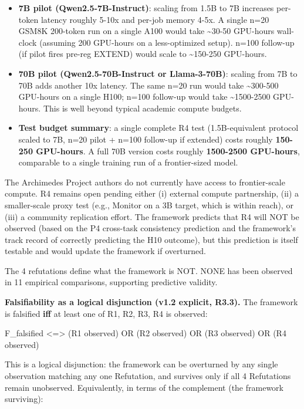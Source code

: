 \documentclass[
]{article}
\begin{document}
\begin{itemize}
\item
  \textbf{7B pilot (Qwen2.5-7B-Instruct)}: scaling from 1.5B to 7B
  increases per-token latency roughly 5-10x and per-job memory 4-5x. A
  single n=20 GSM8K 200-token run on a single A100 would take
  \textasciitilde30-50 GPU-hours wall-clock (assuming 200 GPU-hours on a
  less-optimized setup). n=100 follow-up (if pilot fires pre-reg EXTEND)
  would scale to \textasciitilde150-250 GPU-hours.
\item
  \textbf{70B pilot (Qwen2.5-70B-Instruct or Llama-3-70B)}: scaling from
  7B to 70B adds another 10x latency. The same n=20 run would take
  \textasciitilde300-500 GPU-hours on a single H100; n=100 follow-up
  would take \textasciitilde1500-2500 GPU-hours. This is well beyond
  typical academic compute budgets.
\item
  \textbf{Test budget summary}: a single complete R4 test
  (1.5B-equivalent protocol scaled to 7B, n=20 pilot + n=100 follow-up
  if extended) costs roughly \textbf{150-250 GPU-hours}. A full 70B
  version costs roughly \textbf{1500-2500 GPU-hours}, comparable to a
  single training run of a frontier-sized model.
\end{itemize}

The Archimedes Project authors do not currently have access to
frontier-scale compute. R4 remains open pending either (i) external
compute partnership, (ii) a smaller-scale proxy test (e.g., Monitor on a
3B target, which is within reach), or (iii) a community replication
effort. The framework predicts that R4 will NOT be observed (based on
the P4 cross-task consistency prediction and the framework's track
record of correctly predicting the H10 outcome), but this prediction is
itself testable and would update the framework if overturned.

The 4 refutations define what the framework is NOT. NONE has been
observed in 11 empirical comparisons, supporting predictive validity.

\textbf{Falsifiability as a logical disjunction (v1.2 explicit, R3.3).}
The framework is falsified \textbf{iff} at least one of R1, R2, R3, R4
is observed:

F\_falsified \textless=\textgreater{} (R1 observed) OR (R2 observed) OR
(R3 observed) OR (R4 observed)

This is a logical disjunction: the framework can be overturned by any
single observation matching any one Refutation, and survives only if all
4 Refutations remain unobserved. Equivalently, in terms of the
complement (the framework surviving):
\end{document}
